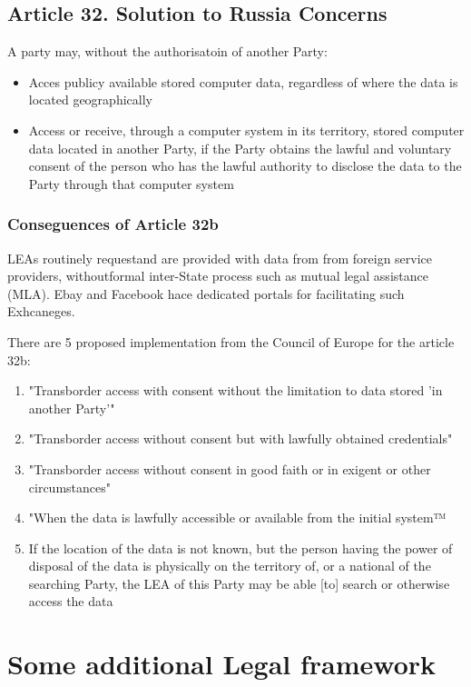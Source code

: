 \subsection{Article 32. Solution to Russia Concerns}
A party may, without the authorisatoin of another Party:
\begin{itemize}
  \item Acces publicy available stored computer data, regardless of where the data is located geographically
  \item Access or receive, through a computer system in its territory, stored computer data located in another Party, if the Party obtains the lawful and voluntary consent of the person who has the lawful authority to disclose the data to the Party through that computer system
\end{itemize}

\subsubsection{Conseguences of Article 32b}
\begin{boxH}
LEAs routinely requestand are provided with data from from foreign service providers, withoutformal inter-State process such as mutual legal assistance (MLA). Ebay and Facebook hace dedicated portals for facilitating such Exhcaneges.
\end{boxH}

There are 5 proposed implementation from the Council of Europe for the article 32b:
\begin{enumerate}[itemsep=0pt]
  \item "Transborder access with consent without the limitation to data stored 'in another Party'"
  \item "Transborder access without consent but with lawfully obtained credentials"
  \item "Transborder access without consent in good faith or in exigent or other circumstances"
  \item "When the data is lawfully accessible or available from the initial system™
  \item If the location of the data is not known, but the person having the power of disposal of the data is physically on the territory of, or a national of the searching Party, the LEA of this Party may be able [to] search or otherwise access the data
\end{enumerate}


\section{Some additional Legal framework}

